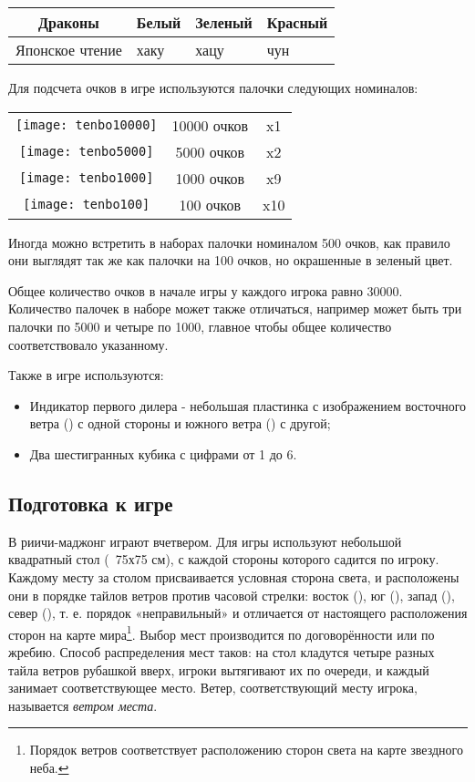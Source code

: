 \begin{tabular}{ |c|C{2cm}|C{2cm}|C{2cm}| } 
	\hline
	 \rule[0ex]{0pt}{6ex} Драконы &  \newline Белый &  \newline Зеленый &  \newline Красный \\
	\hline
	Японское чтение & хаку & хацу & чун \\
	\hline
\end{tabular}

Для подсчета очков в игре используются палочки следующих номиналов:

\begin{tabular}{ |c|c|c| } 
	\hline
	\texttt{[image: tenbo10000]} & 10000 очков & x1 \\
	\texttt{[image: tenbo5000]} & 5000 очков & x2 \\
	\texttt{[image: tenbo1000]} & 1000 очков & x9 \\
	\texttt{[image: tenbo100]} & 100 очков & x10 \\
	\hline
\end{tabular}

Иногда можно встретить в наборах палочки номиналом 500 очков, как правило они выглядят так же как палочки на 100 очков, но окрашенные в зеленый цвет.

Общее количество очков в начале игры у каждого игрока равно 30000. Количество палочек в наборе может также отличаться, например может быть три палочки по 5000 и четыре по 1000, главное чтобы общее количество соответствовало указанному.

\pagebreak

Также в игре используются:
\begin{itemize}
	\item Индикатор первого дилера - небольшая пластинка с изображением восточного ветра () с одной стороны и южного ветра () с другой;
	\item Два шестигранных кубика с цифрами от 1 до 6.
\end{itemize}

\subsection{Подготовка к игре}

В риичи-маджонг играют вчетвером. Для игры используют небольшой квадратный стол (~75х75 см), с каждой стороны которого садится по игроку. Каждому месту за столом присваивается условная сторона света, и расположены они в порядке тайлов ветров против часовой стрелки: восток (), юг (), запад (), север (), т. е. порядок «неправильный» и отличается от настоящего расположения сторон на карте мира\footnote{Порядок ветров соответствует расположению сторон света на карте звездного неба.}. Выбор мест производится по договорённости или по жребию. Способ распределения мест таков: на стол кладутся четыре разных тайла ветров рубашкой вверх, игроки вытягивают их по очереди, и каждый занимает соответствующее место. Ветер, соответствующий месту игрока, называется \textit{ветром места}. 

